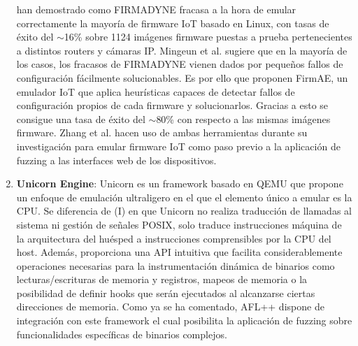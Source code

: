 \begin{enumerate}[I]
    han demostrado como FIRMADYNE\cite{Chen2016} fracasa a la hora de emular correctamente la mayoría de firmware IoT basado en Linux, con tasas de éxito del
    $\sim$16\%\cite{Kim2020} sobre 1124 imágenes firmware puestas a prueba pertenecientes a distintos routers y cámaras IP. Mingeun et al.\cite{Kim2020} 
    sugiere que en la mayoría de los casos, los fracasos de FIRMADYNE\cite{Chen2016} vienen dados por pequeños fallos de configuración fácilmente 
    solucionables. Es por ello que proponen FirmAE, un emulador IoT que aplica heurísticas capaces de detectar fallos de configuración propios de cada
    firmware y solucionarlos. Gracias a esto se consigue una tasa de éxito del $\sim$80\% con respecto a las mismas imágenes firmware.
    Zhang et al.\cite{Zhang2021} hacen uso de ambas herramientas durante su investigación para emular firmware IoT como paso previo a la aplicación de
    fuzzing a las interfaces web de los dispositivos.
    \item \textbf{Unicorn Engine}: Unicorn\cite{unicorn} es un framework basado en QEMU que propone un enfoque de emulación ultraligero en el que el elemento único a 
    emular es la CPU. Se diferencia de (I) en que Unicorn no realiza traducción de llamadas al sistema ni gestión de señales POSIX, solo traduce instrucciones 
    máquina de la arquitectura del huésped a instrucciones comprensibles por la CPU del host. Además, proporciona una API intuitiva que facilita 
    considerablemente operaciones necesarias para la instrumentación dinámica de binarios como lecturas/escrituras de memoria y registros, mapeos de memoria o 
    la posibilidad de definir hooks que serán ejecutados al alcanzarse ciertas direcciones de memoria. Como ya se ha comentado, AFL++ dispone de integración 
    con este framework el cual posibilita la aplicación de fuzzing sobre funcionalidades específicas de binarios complejos.\bigskip 
    

\end{enumerate}
